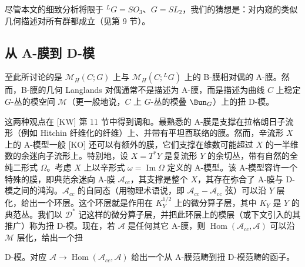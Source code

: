 尽管本文的细致分析将限于 ${}^{L}G=SO_3$、$G=SL_2$，我们的猜想是：对内窥的类似几何描述对所有群都成立（见第 9 节）。

\subsection{从 A-膜到 D-模}

至此所讨论的是 $\mathcal{M}_H(C;G)$ 上与 $\mathcal{M}_H(C;{}^{L}G)$ 上的 B-膜相对偶的 A-膜。然而，B-膜的几何 Langlands 对偶通常不是描述为 A-膜，而是描述为曲线 $C$ 上稳定 $G$-丛的模空间 $\mathcal{M}$（更一般地说，$C$ 上 $G$-丛的模叠 $\Bun_G$）上的扭 D-模。

这两种观点在 [KW] 第 11 节中得到调和。最熟悉的 A-膜是支撑在拉格朗日子流形（例如 Hitchin 纤维化的纤维）上、并带有平坦酉联络的膜。然而，辛流形 $X$ 上的 A-模型一般 [KO] 还可以有额外的膜，它们支撑在维数可能超过 $X$ 的一半维数的余迷向子流形上。特别地，设 $X=T^*Y$ 是复流形 $Y$ 的余切丛，带有自然的全纯二形式 $\Omega$。考虑 $X$ 上以辛形式 $\omega=\operatorname{Im}\Omega$ 定义的 A-模型。该 A-模型容许一个特殊的膜，即典范余迷向 A-膜 $\mathcal{A}_{cc}$，其支撑是整个 $X$，其存在弥合了 A-膜与 D-模之间的鸿沟。$\mathcal{A}_{cc}$ 的自同态（用物理术语说，即 $\mathcal{A}_{cc}-\mathcal{A}_{cc}$ 弦）可以沿 $Y$ 层化，给出一个环层。这个环层就是作用在 $K_Y^{1/2}$ 上的微分算子层，其中 $K_Y$ 是 $Y$ 的典范丛。我们以 $\mathcal{D}^*$ 记这样的微分算子层，并把此环层上的模层（或下文引入的其推广）称为扭 D-模。现在，若 $\mathcal{A}$ 是任何其它 A-膜，则 $\operatorname{Hom}(\mathcal{A}_{cc},\mathcal{A})$ 可以沿 $\mathcal{M}$ 层化，给出一个扭


D-模。对应 $\mathcal{A}\to\operatorname{Hom}(\mathcal{A}_{cc},\mathcal{A})$ 给出一个从 A-膜范畴到扭 D-模范畴的函子。

